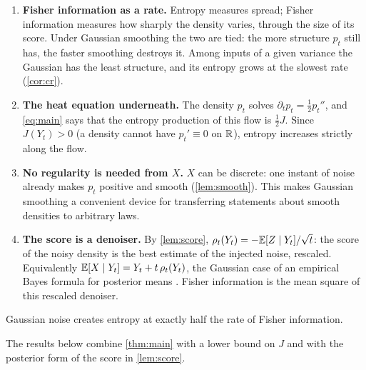 \documentclass{saim-blog}
\begin{document}
\begin{enumerate}
\item \textbf{Fisher information as a rate.} Entropy measures spread; Fisher information measures how sharply the density varies, through the size of its score. Under Gaussian smoothing the two are tied: the more structure $p_t$ still has, the faster smoothing destroys it. Among inputs of a given variance the Gaussian has the least structure, and its entropy grows at the slowest rate (\cref{cor:cr}).
\item \textbf{The heat equation underneath.} The density $p_t$ solves $\partial_tp_t=\tfrac12p_t''$, and \eqref{eq:main} says that the entropy production of this flow is $\tfrac12J$. Since $J(Y_t)>0$ (a density cannot have $p_t'\equiv0$ on $\mathbb{R}$), entropy increases strictly along the flow.
\item \textbf{No regularity is needed from $X$.} $X$ can be discrete: one instant of noise already makes $p_t$ positive and smooth (\cref{lem:smooth}). This makes Gaussian smoothing a convenient device for transferring statements about smooth densities to arbitrary laws.
\item \textbf{The score is a denoiser.} By \cref{lem:score}, $\rho_t(Y_t)=-\mathbb{E}[Z\mid Y_t]/\sqrt t$: the score of the noisy density is the best estimate of the injected noise, rescaled. Equivalently $\mathbb{E}[X\mid Y_t]=Y_t+t\,\rho_t(Y_t)$, the Gaussian case of an empirical Bayes formula for posterior means \citep{efron2011}. Fisher information is the mean square of this rescaled denoiser.
\end{enumerate}

\begin{pullquote}
Gaussian noise creates entropy at exactly half the rate of Fisher information.
\end{pullquote}

\SecUses
The results below combine \cref{thm:main} with a lower bound on $J$ and with the posterior form of the score in \cref{lem:score}.
\end{document}
